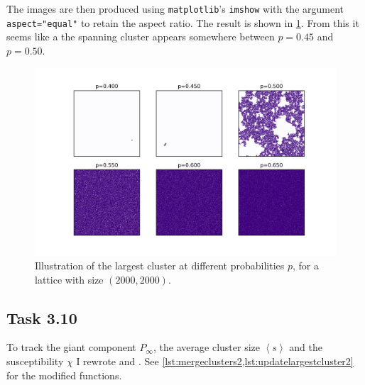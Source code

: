 \documentclass[a4paper]{article}
\begin{document}
The images are then produced using \verb!matplotlib!'s \verb!imshow! with the argument \verb!aspect="equal"! to retain the aspect ratio. The result is shown in \cref{fig:clusterimage}. From this it seems like a the spanning cluster appears somewhere between $p=0.45$ and $p=0.50$.

\begin{figure}
\includegraphics[width=\textwidth]{largest_cluster_L2000.png}%
\caption{Illustration of the largest cluster at different probabilities $p$, for a lattice with size $(2000, 2000)$. \label{fig:clusterimage}}
\end{figure}
\FloatBarrier

\subsection*{Task 3.10}
To track the giant component $P_\infty$, the average cluster size $\left<s\right>$ and the susceptibility $\chi$ I rewrote  and . See \cref{lst:mergeclusters2,lst:updatelargestcluster2} for the modified functions.

\begin{listing}[h!]
%
\caption{%
    Member function of the class  that merges two clusters. This is an updated version of the one shown in \cref{lst:mergeclusters}, with the difference highlighted with dark grey background color.
    \label{lst:mergeclusters2}%
}
\end{listing}

\begin{listing}[h!]
%
\caption{%
    Member function of the class  that updates various parameters we want to track. This is an updated version of the one shown in \cref{lst:updatelargestcluster}, with the difference highlighted with dark grey background color.
    \label{lst:updatelargestcluster2}%
}
\end{listing}
\FloatBarrier
\end{document}
